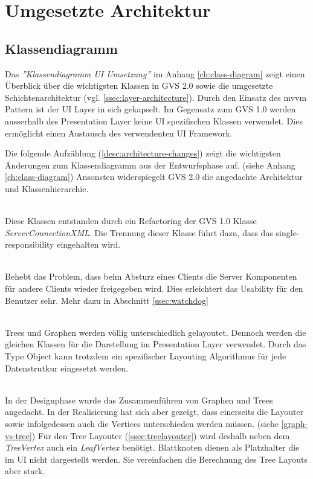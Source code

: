 \documentclass[11pt,a4paper,english,oneside]{book}
\numberwithin{equation}{chapter}
\begin{document}
	\section{Umgesetzte Architektur}
	
	\subsection{Klassendiagramm}
	Das \textit{''Klassendiagramm UI Umsetzung''} im Anhang \ref{ch:class-diagram} zeigt einen Überblick über die wichtigsten Klassen in GVS 2.0 sowie die umgesetzte Schichtenarchitektur (vgl. \ref{ssec:layer-architecture}). Durch den Einsatz des \gls{mvvm} Pattern ist der UI Layer in sich gekapselt. Im Gegensatz zum GVS 1.0 werden ausserhalb des Presentation Layer keine UI spezifischen Klassen verwendet. Dies ermöglicht einen Austausch des verwendenten UI Framework.
	

	\noindent
	Die folgende Aufzählung (\ref{desc:architecture-changes}) zeigt die wichtigsten Änderungen zum Klassendiagramm aus der Entwurfsphase auf. (siehe Anhang \ref{ch:class-diagram}) Ansonsten widerspiegelt GVS 2.0 die angedachte Architektur und Klassenhierarchie.
	
	\begin{description} \label{desc:architecture-changes}
		\item[GvsXmlReader \& ClientConnection ] \hfill \\ Diese Klassen entstanden durch ein Refactoring der GVS 1.0 Klasse \textit{ServerConnectionXML}. Die Trennung dieser Klasse führt dazu, dass das \gls{single-responsibility}  eingehalten wird. 
		\item[Watchdog] \hfill \\ Behebt das Problem, dass beim Absturz eines Clients die Server Komponenten für andere Clients wieder freigegeben wird. Dies erleichtert das Usability für den Benutzer sehr. Mehr dazu in Abschnitt \ref{ssec:watchdog}
		\item[SessionType] \hfill \\ Trees und Graphen werden völlig unterschiedlich gelayoutet. Dennoch werden die gleichen Klassen für die Darstellung im Presentation Layer verwendet. Durch das Type Object kann trotzdem ein spezifischer Layouting Algorithmus für jede Datenstrutkur eingesetzt werden.
		\item[TreeVertex \& LeafVertex] \hfill \\ 
		In der Designphase wurde das Zusammenführen von Graphen und Trees angedacht. In der Realisierung hat sich aber gezeigt, dass einerseits die Layouter sowie infolgedessen auch die Vertices unterschieden werden müssen. (siehe \ref{graph-vs-tree}) Für den Tree Layouter (\ref{ssec:treelayouter}) wird deshalb neben dem \textit{TreeVertex} auch ein \textit{LeafVertex} benötigt.  Blattknoten dienen als Platzhalter die im UI nicht dargestellt werden. Sie vereinfachen die Berechnung des Tree Layouts aber stark.
	\end{description}
\end{document}
